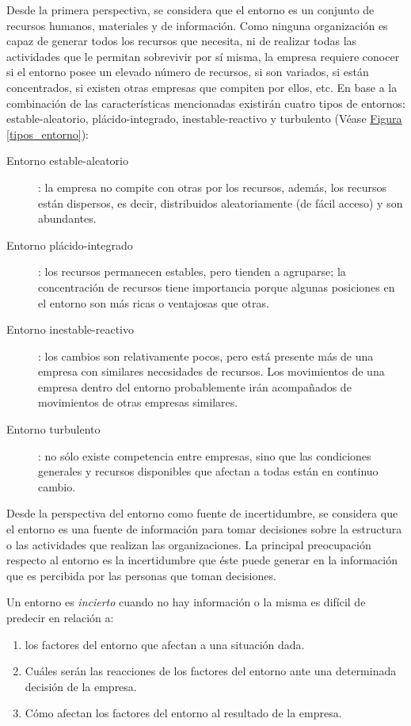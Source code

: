 \documentclass[10pt,a4paper,spanish]{report}
\begin{document}
        Desde la primera perspectiva, se considera que el entorno es un conjunto de recursos humanos, materiales y de información. Como ninguna organización es capaz de generar todos los recursos que necesita, ni de realizar todas las actividades que le permitan sobrevivir por sí misma, la empresa requiere conocer si el entorno posee un elevado número de recursos, si son variados, si están concentrados, si existen otras empresas que compiten por ellos, etc. En base a la combinación de las características mencionadas existirán cuatro tipos de entornos: estable-aleatorio, plácido-integrado, inestable-reactivo y turbulento (Véase \hyperref[tipos_entorno]{Figura \ref*{tipos_entorno}}):
            \begin{description}
                  \item[Entorno estable-aleatorio]: la empresa no compite con otras por los recursos, además, los recursos están dispersos, es decir, distribuidos aleatoriamente (de fácil acceso) y son abundantes.
                  \item[Entorno plácido-integrado]: los recursos permanecen estables, pero tienden a agruparse; la concentración de recursos tiene importancia porque algunas posiciones en el entorno son más ricas o ventajosas que otras.
                  \item[Entorno inestable-reactivo]: los cambios son relativamente pocos, pero está presente más de una empresa con similares necesidades de recursos. Los movimientos de una empresa dentro del entorno probablemente irán acompañados de movimientos de otras empresas similares.
                  \item[Entorno turbulento]: no sólo existe competencia entre empresas, sino que las condiciones generales y recursos disponibles que afectan a todas están en continuo cambio.
            \end{description}

            Desde la perspectiva del entorno como fuente de incertidumbre, se considera que el entorno es una fuente de información para tomar decisiones sobre la estructura o las actividades que realizan las organizaciones. La principal preocupación respecto al entorno es la incertidumbre que éste puede generar en la información que es percibida por las personas que toman decisiones. 

            Un entorno es \textit{\textcolor[rgb]{0.3,0.4,0.6}{incierto}} cuando no hay información o la misma es difícil de predecir en relación a:
            \begin{enumerate}[1.]
                  \item los factores del entorno que afectan a una situación dada.
                  \item Cuáles serán las reacciones de los factores del entorno ante una determinada decisión de la empresa.
                  \item Cómo afectan los factores del entorno al resultado de la empresa.
            \end{enumerate}
\end{document}
